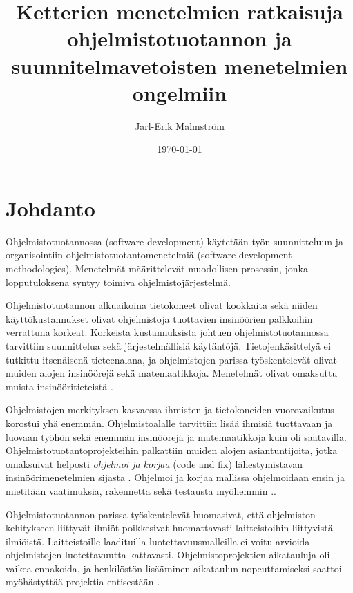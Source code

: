 \documentclass[finnish]{tktltiki2}
\title{Ketterien menetelmien ratkaisuja ohjelmistotuotannon ja suunnitelmavetoisten menetelmien ongelmiin}
\author{Jarl-Erik Malmström}
\date{\today}
\theoremstyle{definition}
\theoremstyle{remark}
\begin{document}

\maketitle        %
\makeabstract     %

\tableofcontents  %
\newpage          %



\section{Johdanto}

Ohjelmistotuotannossa (software development) käytetään työn suunnitteluun ja organisointiin ohjelmistotuotantomenetelmiä (software development methodologies). Menetelmät määrittelevät muodollisen prosessin, jonka lopputuloksena syntyy toimiva ohjelmistojärjestelmä.

Ohjelmistotuotannon alkuaikoina tietokoneet olivat kookkaita sekä niiden käyttö\-kustannukset olivat ohjelmistoja tuottavien insinöörien palkkoihin verrattuna korkeat. Korkeista kustannuksista johtuen ohjelmistotuotannossa tarvittiin suunnittelua sekä järjestelmällisiä käytäntöjä. Tietojenkäsittelyä ei tutkittu itsenäisenä tieteenalana, ja ohjelmistojen parissa työsken\-televät olivat muiden alojen insinöörejä sekä matemaatikkoja. Menetelmät olivat omaksuttu muista insinööritieteistä \cite{BOE06}.

Ohjelmistojen merkityksen kasvaessa ihmisten ja tietokoneiden vuorovaikutus korostui yhä enemmän. Ohjelmistoalalle tarvittiin lisää ihmisiä tuottavaan ja luovaan työhön sekä enemmän insinöörejä ja matemaatikkoja kuin oli saatavilla. Ohjelmistotuotantoprojekteihin palkattiin muiden alojen asiantuntijoita, jotka omaksuivat helposti \textit{ohjelmoi ja korjaa} (code and fix) lähestymistavan insinööri\-menetelmien sijasta \cite{BOE06}. Ohjelmoi ja korjaa mallissa ohjelmoidaan ensin ja mietitään vaatimuksia, rakennetta sekä testausta myöhemmin .\cite{BOE88}.

Ohjelmistotuotannon parissa työskentelevät huomasivat, että ohjelmiston kehitykseen liittyvät ilmiöt poikkesivat huomattavasti laitteistoihin liittyvistä ilmiöistä. Laitteistoille laadituilla luotettavuusmalleilla ei voitu arvioida ohjelmistojen luotettavuutta kattavasti. Ohjelmistoprojektien aikatauluja oli vaikea ennakoida, ja henkilöstön lisääminen aikataulun nopeuttamiseksi saattoi myöhästyttää projektia entisestään \cite{BOE06}.
\end{document}
